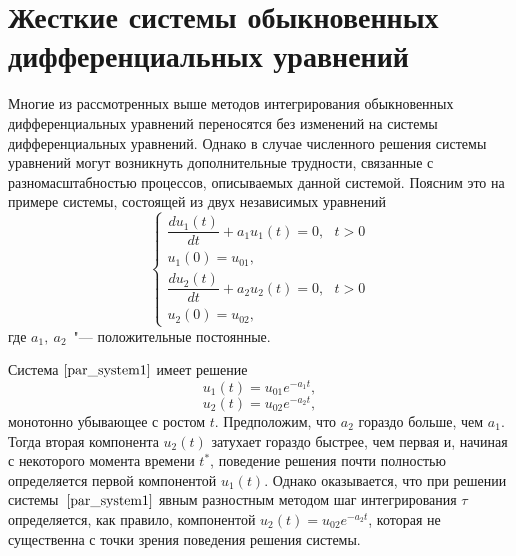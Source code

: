 \documentclass[11pt,a4paper,twoside,listtotoc,bibtotoc]{report}
\numberwithin{equation}{section}
\theoremstyle{definition}
\theoremstyle{plain}
\begin{document}
\section{Жесткие системы обыкновенных дифференциальных уравнений}
%
Многие из рассмотренных выше методов интегрирования обыкновенных
дифференциальных уравнений переносятся без изменений на системы
дифференциальных уравнений. Однако в случае численного решения
системы уравнений могут возникнуть дополнительные трудности,
связанные с разномасштабностью процессов, описываемых данной
системой. Поясним это на примере системы, состоящей из двух
независимых уравнений
%
\begin{equation}
%
    \label{par_system1}
    \begin{cases}
        \dfrac{du_1(t)}{dt} + a_1u_1(t) = 0,~~~t > 0 \\
        u_1(0) = u_{01},\\
        \dfrac{du_2(t)}{dt} + a_2u_2(t) = 0,~~~t > 0\\
        u_2(0) = u_{02},
    \end{cases}
%
\end{equation}
%
где $a_1,~a_2$~"--- положительные постоянные.

Система $\eqref{par_system1}$ имеет решение
%
$$
    u_1(t)=u_{01}e^{-a_1t},
$$
%
$$
    u_2(t)=u_{02}e^{-a_2t},
$$
%
монотонно убывающее с ростом $t$. Предположим, что $a_2$ гораздо больше,
чем $a_1$. Тогда вторая компонента $u_2(t)$ затухает гораздо быстрее, чем
первая и, начиная с некоторого момента времени $t^*$, поведение решения
почти полностью определяется первой компонентой $u_1(t)$. Однако оказывается,
что при решении системы~$\eqref{par_system1}$ явным разностным методом шаг интегрирования
$\tau$ определяется, как правило, компонентой $u_2(t)=u_{02}e^{-a_2t}$,
которая не существенна с точки зрения поведения решения системы.
\vspace{1em}
\begin{figure}[H]
\centering
{}
\end{figure}
\vspace{1em}
\end{document}
